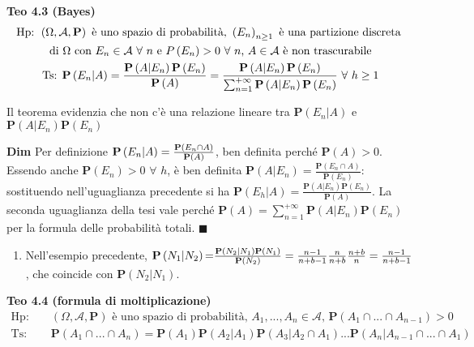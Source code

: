 \documentclass{article}
\begin{document}
\textbf{Teo 4.3 (Bayes)}%
\begin{gather*}
\text{Hp}\text{: }\left( \Omega ,\mathcal{A},\mathbf{P}\right) \text{ \`{e}
uno spazio di probabilit\`{a}, }\left( E_{n}\right) _{n\geq 1}\text{ \`{e}
una partizione discreta } \\
\text{di }\Omega \text{ con }E_{n}\in \mathcal{A}\text{ }\forall \text{ }n%
\text{ e }P\left( E_{n}\right) >0\text{ }\forall \text{ }n\text{, }A\in 
\mathcal{A}\text{ \`{e} non trascurabile} \\
\text{Ts}\text{: }\mathbf{P}\left( E_{n}|A\right) =\frac{\mathbf{P}\left(
A|E_{n}\right) \mathbf{P}\left( E_{n}\right) }{\mathbf{P}\left( A\right) }=%
\frac{\mathbf{P}\left( A|E_{n}\right) \mathbf{P}\left( E_{n}\right) }{%
\sum_{n=1}^{+\infty }\mathbf{P}\left( A|E_{n}\right) \mathbf{P}\left(
E_{n}\right) }\text{ }\forall \text{ }h\geq 1
\end{gather*}

Il teorema evidenzia che non c'\`{e} una relazione lineare tra $\mathbf{P}%
\left( E_{n}|A\right) $ e $\mathbf{P}\left( A|E_{n}\right) \mathbf{P}\left(
E_{n}\right) $

\textbf{Dim} Per definizione $\mathbf{P}\left( E_{n}|A\right) =\frac{\mathbf{%
P}\left( E_{n}\cap A\right) }{\mathbf{P}\left( A\right) }$, ben definita
perch\'{e} $\mathbf{P}\left( A\right) >0$. Essendo anche $\mathbf{P}\left(
E_{n}\right) >0$ $\forall $ $h$, \`{e} ben definita $\mathbf{P}\left(
A|E_{n}\right) =\frac{\mathbf{P}\left( E_{n}\cap A\right) }{\mathbf{P}\left(
E_{n}\right) }$: sostituendo nell'uguaglianza precedente si ha $\mathbf{P}%
\left( E_{h}|A\right) =\frac{\mathbf{P}\left( A|E_{n}\right) \mathbf{P}%
\left( E_{n}\right) }{\mathbf{P}\left( A\right) }$. La seconda uguaglianza
della tesi vale perch\'{e} $\mathbf{P}\left( A\right) =\sum_{n=1}^{+\infty }%
\mathbf{P}\left( A|E_{n}\right) \mathbf{P}\left( E_{n}\right) $ per la
formula delle probabilit\`{a} totali. $\blacksquare $

\begin{enumerate}
\item Nell'esempio precedente, $\mathbf{P}\left( N_{1}|N_{2}\right) \mathbf{=%
}\frac{\mathbf{P}\left( N_{2}|N_{1}\right) \mathbf{P}\left( N_{1}\right) }{%
\mathbf{P}\left( N_{2}\right) }=\frac{n-1}{n+b-1}\frac{n}{n+b}\frac{n+b}{n}=%
\frac{n-1}{n+b-1}$, che coincide con $\mathbf{P}\left( N_{2}|N_{1}\right) $.
\end{enumerate}

\textbf{Teo 4.4 (formula di moltiplicazione)}%
\begin{eqnarray*}
\text{Hp}\text{: } &&\left( \Omega ,\mathcal{A},\mathbf{P}\right) \text{ 
\`{e} uno spazio di probabilit\`{a}, }A_{1},...,A_{n}\in \mathcal{A}\text{, }%
\mathbf{P}\left( A_{1}\cap ...\cap A_{n-1}\right) >0 \\
\text{Ts}\text{: } &&\mathbf{P}\left( A_{1}\cap ...\cap A_{n}\right) =%
\mathbf{P}\left( A_{1}\right) \mathbf{P}\left( A_{2}|A_{1}\right) \mathbf{P}%
\left( A_{3}|A_{2}\cap A_{1}\right) ...\mathbf{P}\left( A_{n}|A_{n-1}\cap
...\cap A_{1}\right)
\end{eqnarray*}
\end{document}
